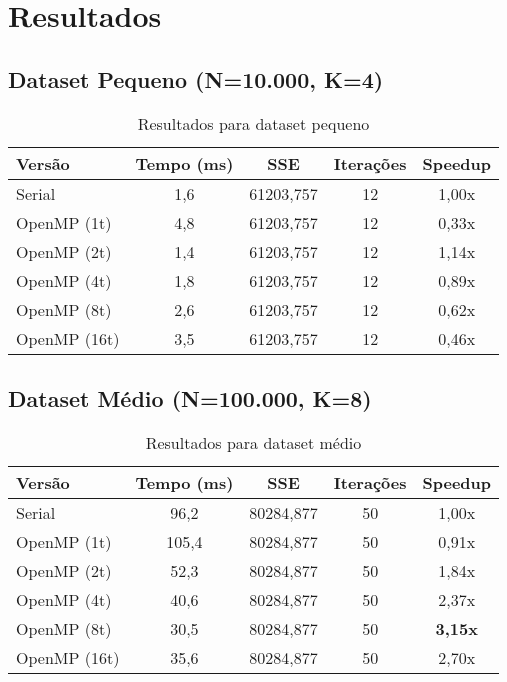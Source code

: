 \documentclass[12pt,a4paper]{article}
\begin{document}
\section{Resultados}

\subsection{Dataset Pequeno (N=10.000, K=4)}

\begin{table}[H]
\centering
\begin{tabular}{lcccc}
\toprule
\textbf{Versão} & \textbf{Tempo (ms)} & \textbf{SSE} & \textbf{Iterações} & \textbf{Speedup} \\
\midrule
Serial & 1,6 & 61203,757 & 12 & 1,00x \\
OpenMP (1t) & 4,8 & 61203,757 & 12 & 0,33x \\
OpenMP (2t) & 1,4 & 61203,757 & 12 & 1,14x \\
OpenMP (4t) & 1,8 & 61203,757 & 12 & 0,89x \\
OpenMP (8t) & 2,6 & 61203,757 & 12 & 0,62x \\
OpenMP (16t) & 3,5 & 61203,757 & 12 & 0,46x \\
\bottomrule
\end{tabular}
\caption{Resultados para dataset pequeno}
\end{table}

\subsection{Dataset Médio (N=100.000, K=8)}

\begin{table}[H]
\centering
\begin{tabular}{lcccc}
\toprule
\textbf{Versão} & \textbf{Tempo (ms)} & \textbf{SSE} & \textbf{Iterações} & \textbf{Speedup} \\
\midrule
Serial & 96,2 & 80284,877 & 50 & 1,00x \\
OpenMP (1t) & 105,4 & 80284,877 & 50 & 0,91x \\
OpenMP (2t) & 52,3 & 80284,877 & 50 & 1,84x \\
OpenMP (4t) & 40,6 & 80284,877 & 50 & 2,37x \\
OpenMP (8t) & 30,5 & 80284,877 & 50 & \textbf{3,15x} \\
OpenMP (16t) & 35,6 & 80284,877 & 50 & 2,70x \\
\bottomrule
\end{tabular}
\caption{Resultados para dataset médio}
\end{table}
\end{document}
